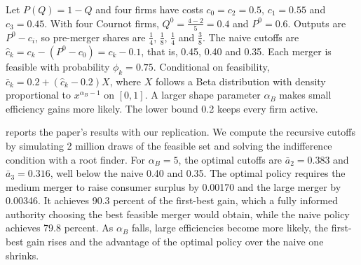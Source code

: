 \begin{example}\label{ex:11-nw}
Let $P(Q) = 1 - Q$ and four firms have costs $c_0 = c_2 = 0.5$, $c_1 = 0.55$ and $c_3 = 0.45$. With four Cournot firms,
$Q^0 = \frac{4 - 2}{5} = 0.4$ and $P^0 = 0.6$. Outputs are $P^0 - c_i$, so pre-merger shares are $\frac{1}{4}$,
$\frac{1}{8}$, $\frac{1}{4}$ and $\frac{3}{8}$. The naive cutoffs are $\hat c_k = c_k - (P^0 - c_0) = c_k - 0.1$, that is,
0.45, 0.40 and 0.35. Each merger is feasible with probability $\phi_k = 0.75$. Conditional on feasibility, $\bar c_k =
0.2 + (\hat c_k - 0.2)X$, where $X$ follows a Beta distribution with density proportional to $x^{\alpha_B - 1}$ on $[0,
1]$. A larger shape parameter $\alpha_B$ makes small efficiency gains more likely. The lower bound 0.2 keeps every firm
active.
\end{example}

 reports the paper's results with our replication. We compute the recursive cutoffs by simulating 2
million draws of the feasible set and solving the indifference condition with a root finder. For $\alpha_B = 5$, the
optimal cutoffs are $\bar a_2 = 0.383$ and $\bar a_3 = 0.316$, well below the naive 0.40 and 0.35. The optimal policy
requires the medium merger to raise consumer surplus by 0.00170 and the large merger by 0.00346. It achieves 90.3 percent
of the first-best gain, which a fully informed authority choosing the best feasible merger would obtain, while the naive
policy achieves 79.8 percent. As $\alpha_B$ falls, large efficiencies become more likely, the first-best gain rises and
the advantage of the optimal policy over the naive one shrinks.

